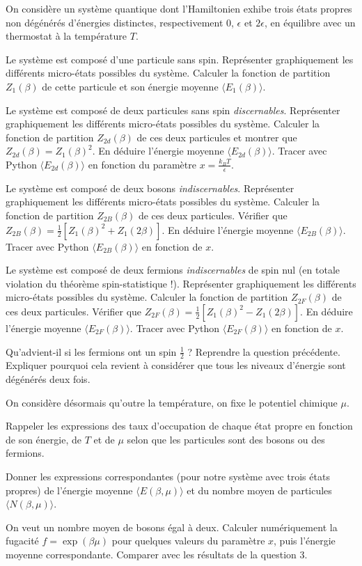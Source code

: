 On considère un système quantique dont l'Hamiltonien exhibe trois états propres non dégénérés d'énergies distinctes, respectivement 0, $\epsilon$ et $2\epsilon$, en équilibre avec un thermostat à la température $T$.

\medskip

\question
Le système est composé d'une particule sans spin. Représenter graphiquement les différents micro-états possibles du système. Calculer la fonction de partition $Z_1(\beta)$ de cette particule et son énergie moyenne $\langle E_1 (\beta) \rangle$.

\question
Le système est composé de deux particules sans spin \textit{discernables}. Représenter graphiquement les différents micro-états possibles du système. Calculer la fonction de partition $Z_{2d}(\beta)$ de ces deux particules et montrer que  $Z_{2d}(\beta)=Z_1(\beta)^2$. En déduire l'énergie moyenne $\langle E_{2d}(\beta) \rangle$. Tracer avec Python $\langle E_{2d}(\beta) \rangle$ en fonction du paramètre $x=\frac{k_BT}{\epsilon}$. 

\question
Le système est composé de deux bosons \textit{indiscernables}. Représenter graphiquement les différents micro-états possibles du système. Calculer la fonction de partition $Z_{2B}(\beta)$ de ces deux particules. Vérifier que  $Z_{2B}(\beta)=\frac{1}{2} [Z_1(\beta)^2+Z_1(2\beta)]$. En déduire l'énergie moyenne $\langle E_{2B}(\beta) \rangle$. Tracer avec Python $\langle E_{2B}(\beta) \rangle$ en fonction de $x$. 

\question
Le système est composé de deux fermions \textit{indiscernables} de spin nul (en totale violation du théorème spin-statistique !). Représenter graphiquement les différents micro-états possibles du système. Calculer la fonction de partition $Z_{2F}(\beta)$ de ces deux particules. Vérifier que  $Z_{2F}(\beta)=\frac{1}{2} [Z_1(\beta)^2-Z_1(2\beta)]$. En déduire l'énergie moyenne $\langle E_{2F}(\beta) \rangle$. Tracer avec Python $\langle E_{2F}(\beta) \rangle$ en fonction de $x$. 

\question
Qu'advient-il si les fermions ont un spin $\frac{1}{2}$ ? Reprendre la question précédente. Expliquer pourquoi cela revient à considérer que tous les niveaux d'énergie sont dégénérés deux fois.

\medskip

On considère désormais qu'outre la température, on fixe le potentiel chimique $\mu$.

\medskip

\question
Rappeler les expressions des taux d'occupation de chaque état propre en fonction de son énergie, de $T$ et de $\mu$ selon que les particules sont des bosons ou des fermions.

\question
Donner les expressions correspondantes (pour notre système avec trois états propres) de l'énergie moyenne $\langle E (\beta,\mu) \rangle$ et du nombre moyen de particules $\langle N(\beta,\mu) \rangle$.

\question
On veut un nombre moyen de bosons égal à deux. Calculer numériquement la fugacité $f=\exp(\beta \mu)$ pour quelques valeurs du paramètre $x$, puis l'énergie moyenne correspondante. Comparer avec les résultats de la question 3.  
